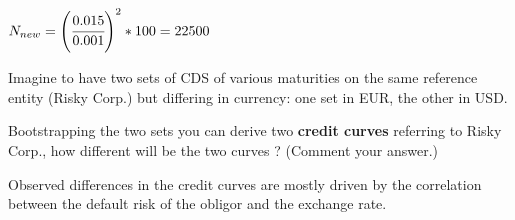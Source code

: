 \documentclass[12pt,a4paper]{exam}
\begin{document}
\begin{questions}
\makeemptybox{1.5 cm}

\begin{solution}
$N_{new} = \left(\cfrac{0.015}{0.001}\right)^{2}*100 = 22500$
\end{solution}

\question Imagine to have two sets of CDS of various maturities on the same reference entity (Risky Corp.) but differing in currency: one set in EUR, the other in USD.

Bootstrapping the two sets you can derive two \textbf{credit curves} referring to Risky Corp., how different will be the two curves ? (Comment your answer.)

\fillwithlines{3cm}

\begin{solution}
Observed differences in the credit curves are mostly driven by the correlation between the default risk of the obligor and the exchange rate.
\end{solution}
\end{questions}
\end{document}
